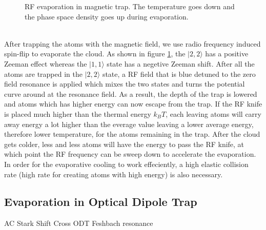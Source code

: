 \begin{figure}
\begin{center}
{
    }
  \end{center}
  \caption{RF evaporation in magnetic trap. The temperature goes down and the phase space density goes up during evaporation.}
  \label{mt:evap}
\end{figure}\\
After trapping the atoms with the magnetic field, we use radio frequency induced spin-flip to evaporate the cloud. As shown in figure \ref{mt:evap}, the $|2, 2\rangle$ has a positive Zeeman effect whereas the $|1, 1\rangle$ state has a negetive Zeeman shift. After all the atoms are trapped in the $|2, 2\rangle$ state, a RF field that is blue detuned to the zero field resonance is applied which mixes the two states and turns the potential curve around at the resonance field. As a result, the depth of the trap is lowered and atoms which has higher energy can now escape from the trap. If the RF knife is placed much higher than the thermal energy $k_BT$, each leaving atoms will carry away energy a lot higher than the everage value leaving a lower average energy, therefore lower temperature, for the atoms remaining in the trap. After the cloud gets colder, less and less atoms will have the energy to pass the RF knife, at which point the RF frequency can be sweep down to accelerate the evaporation. In order for the evaporative cooling to work effeciently, a high elastic collision rate (high rate for creating atoms with high energy) is also necessary.

\subsection{Evaporation in Optical Dipole Trap}\label{theory:odt}
AC Stark Shift
Cross ODT
Feshbach resonance
